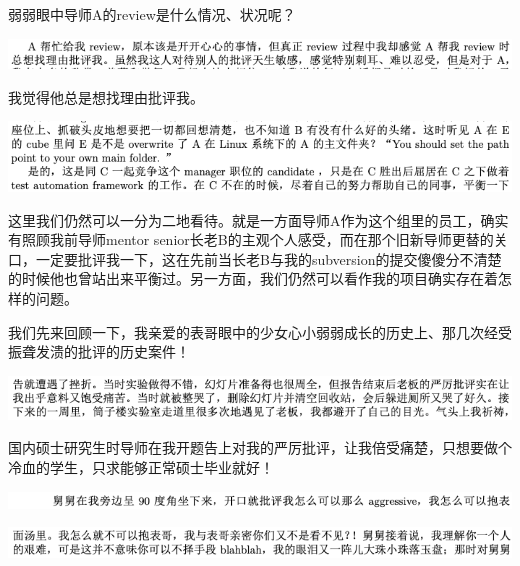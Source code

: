 \documentclass[9pt, b5paper]{article}
\begin{document}
弱弱眼中导师A的review是什么情况、状况呢？

\begin{center}
\includegraphics[width=.9\linewidth]{./pic/backups_plans_20210511_125437.png}
\end{center}

我觉得他总是想找理由批评我。

\begin{center}
\includegraphics[width=.9\linewidth]{./pic/backups_plans_20210511_130349.png}
\end{center}

这里我们仍然可以一分为二地看待。就是一方面导师A作为这个组里的员工，确实有照顾我前导师mentor senior长老B的主观个人感受，而在那个旧新导师更替的关口，一定要批评我一下，这在先前当长老B与我的subversion的提交傻傻分不清楚的时候他也曾站出来平衡过。另一方面，我们仍然可以看作我的项目确实存在着怎样的问题。 

我们先来回顾一下，我亲爱的表哥眼中的少女心小弱弱成长的历史上、那几次经受振聋发溃的批评的历史案件！

\begin{center}
\includegraphics[width=.9\linewidth]{./pic/backups_plans_20210511_161158.png}
\end{center}

国内硕士研究生时导师在我开题告上对我的严厉批评，让我倍受痛楚，只想要做个冷血的学生，只求能够正常硕士毕业就好！

\begin{center}
\includegraphics[width=.9\linewidth]{./pic/backups_plans_20210512_100225.png}
\end{center}

\begin{center}
\includegraphics[width=.9\linewidth]{./pic/backups_plans_20210512_100246.png}
\end{center}
\end{document}
